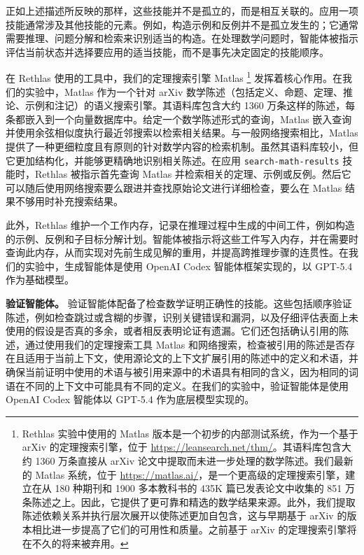 ﻿\documentclass[]{pkuai4m}
\theoremstyle{plain}
\theoremstyle{definition}
\begin{document}
正如上述描述所反映的那样，这些技能并不是孤立的，而是相互关联的。应用一项技能通常涉及其他技能的元素。例如，构造示例和反例并不是孤立发生的；它通常需要推理、问题分解和检索来识别适当的构造。在处理数学问题时，智能体被指示评估当前状态并选择要应用的适当技能，而不是事先决定固定的技能顺序。

在 Rethlas 使用的工具中，我们的定理搜索引擎 Matlas \footnote{Rethlas 实验中使用的 Matlas 版本是一个初步的内部测试系统，作为一个基于 arXiv 的定理搜索引擎，位于 \href{https://leansearch.net/thm/}{https://leansearch.net/thm/}。其语料库包含大约 1360 万条直接从 arXiv 论文中提取而未进一步处理的数学陈述。我们最新的 Matlas 系统，位于 \href{https://matlas.ai/}{https://matlas.ai/}，是一个更高级的定理搜索引擎，建立在从 180 种期刊和 1900 多本教科书的 435K 篇已发表论文中收集的 851 万条陈述之上。因此，它提供了更可靠和精选的数学结果来源。此外，我们提取陈述依赖关系并执行层次展开以使陈述更加自包含，这与早期基于 arXiv 的版本相比进一步提高了它们的可用性和质量。之前基于 arXiv 的定理搜索引擎将在不久的将来被弃用。} 发挥着核心作用。在我们的实验中，Matlas 作为一个针对 arXiv 数学陈述（包括定义、命题、定理、推论、示例和注记）的语义搜索引擎。其语料库包含大约 1360 万条这样的陈述，每条都嵌入到一个向量数据库中。给定一个数学陈述形式的查询，Matlas 嵌入查询并使用余弦相似度执行最近邻搜索以检索相关结果。与一般网络搜索相比，Matlas 提供了一种更细粒度且有原则的针对数学内容的检索机制。虽然其语料库较小，但它更加结构化，并能够更精确地识别相关陈述。在应用 \texttt{search-math-results} 技能时，Rethlas 被指示首先查询 Matlas 并检索相关的定理、示例或反例。然后它可以随后使用网络搜索要么跟进并查找原始论文进行详细检查，要么在 Matlas 结果不够用时补充搜索结果。

此外，Rethlas 维护一个工作内存，记录在推理过程中生成的中间工件，例如构造的示例、反例和子目标分解计划。智能体被指示将这些工件写入内存，并在需要时查询此内存，从而实现对先前生成见解的重用，并提高跨推理步骤的连贯性。在我们的实验中，生成智能体是使用 OpenAI Codex 智能体框架实现的，以 GPT-5.4 作为基础模型。

\textbf{验证智能体。} 验证智能体配备了检查数学证明正确性的技能。这些包括顺序验证陈述，例如检查跳过或含糊的步骤，识别关键错误和漏洞，以及仔细评估表面上未使用的假设是否真的多余，或者相反表明论证有遗漏。它们还包括确认引用的陈述，通过使用我们的定理搜索工具 Matlas 和网络搜索，检查被引用的陈述是否存在且适用于当前上下文，使用源论文的上下文扩展引用的陈述中的定义和术语，并确保当前证明中使用的术语与被引用来源中的术语具有相同的含义，因为相同的词语在不同的上下文中可能具有不同的定义。在我们的实验中，验证智能体是使用 OpenAI Codex 智能体以 GPT-5.4 作为底层模型实现的。
\end{document}
